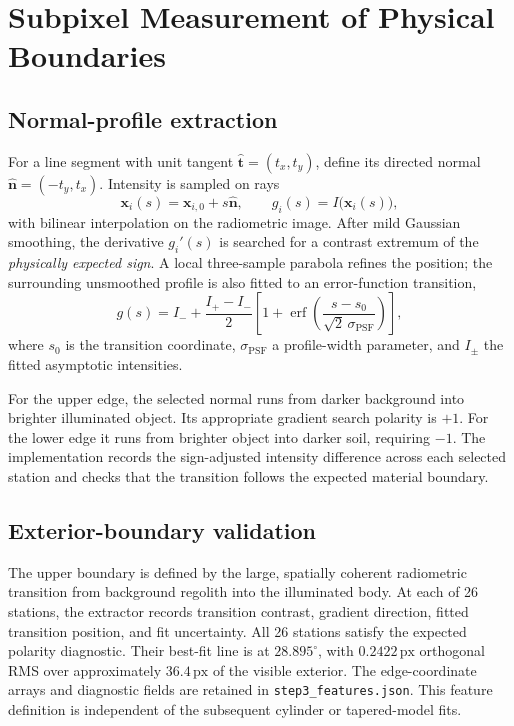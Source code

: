 \documentclass[11pt,letterpaper]{article}
\newcommand{\px}{\,\mathrm{px}}
\newcommand{\sourcepath}[1]{\nolinkurl{#1}}
\newcommand{\mat}[1]{\mathbf{#1}}
\begin{document}
\section{Subpixel Measurement of Physical Boundaries}
\label{sec:edges}

\subsection{Normal-profile extraction}

For a line segment with unit tangent \(\hat{\mat t}=(t_x,t_y)\), define its directed normal \(\hat{\mat n}=(-t_y,t_x)\). Intensity is sampled on rays
\begin{equation}
 \mat x_i(s)=\mat x_{i,0}+s\hat{\mat n},\qquad
 g_i(s)=I\bigl(\mat x_i(s)\bigr),
\end{equation}
with bilinear interpolation on the radiometric image. After mild Gaussian smoothing, the derivative \(g_i'(s)\) is searched for a contrast extremum of the \emph{physically expected sign}. A local three-sample parabola refines the position; the surrounding unsmoothed profile is also fitted to an error-function transition,
\begin{equation}
 g(s)=I_-+\frac{I_+-I_-}{2}
 \left[1+\operatorname{erf}\left(\frac{s-s_0}{\sqrt 2\,\sigma_{\mathrm{PSF}}}\right)\right],
 \label{eq:erf}
\end{equation}
where \(s_0\) is the transition coordinate, \(\sigma_{\mathrm{PSF}}\) a profile-width parameter, and \(I_\pm\) the fitted asymptotic intensities.

For the upper edge, the selected normal runs from darker background into brighter illuminated object. Its appropriate gradient search polarity is \(+1\). For the lower edge it runs from brighter object into darker soil, requiring \(-1\). The implementation records the sign-adjusted intensity difference across each selected station and checks that the transition follows the expected material boundary.

\subsection{Exterior-boundary validation}
\label{sec:exterior}

The upper boundary is defined by the large, spatially coherent radiometric transition from background regolith into the illuminated body. At each of 26 stations, the extractor records transition contrast, gradient direction, fitted transition position, and fit uncertainty. All 26 stations satisfy the expected polarity diagnostic. Their best-fit line is at $28.895^\circ$, with $0.2422\px$ orthogonal RMS over approximately $36.4\px$ of the visible exterior. The edge-coordinate arrays and diagnostic fields are retained in \sourcepath{step3_features.json}. This feature definition is independent of the subsequent cylinder or tapered-model fits.
\end{document}
